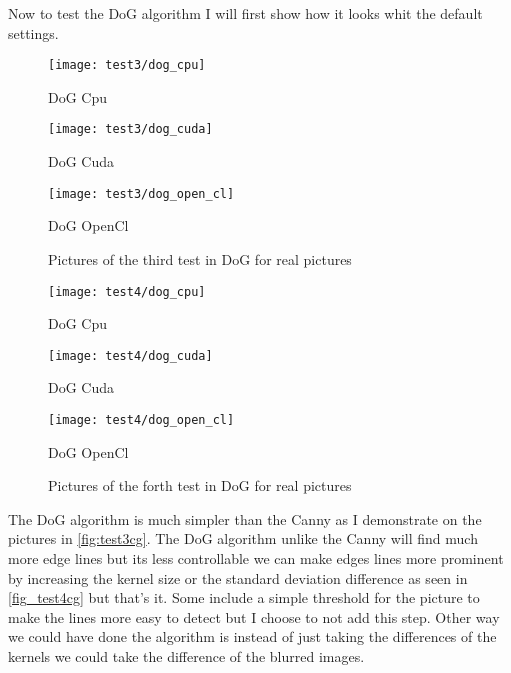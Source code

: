 Now to test the \ac{DoG} algorithm I will first show how it looks whit the default settings.
\begin{figure}[H]
\centering
\begin{minipage}[t]{.325\textwidth}
\centering
\texttt{[image: test3/dog\_cpu]}
\addtocounter{figure}{-1}
\captionsetup{labelformat=empty}
\caption[]{DoG Cpu}
\end{minipage}
\begin{minipage}[t]{.325\textwidth}
\centering
\texttt{[image: test3/dog\_cuda]}
\addtocounter{figure}{-1}
\captionsetup{labelformat=empty}
\caption[]{DoG Cuda}
\end{minipage}
\begin{minipage}[t]{.325\textwidth}
\centering
\texttt{[image: test3/dog\_open\_cl]}
\addtocounter{figure}{-1}
\captionsetup{labelformat=empty}
\caption[]{DoG OpenCl}
\end{minipage}
\caption{Pictures of the third test in \ac{DoG} for real pictures}
\label{fig:test3cg}
\end{figure}

\begin{figure}[H]
\centering
\begin{minipage}[t]{.325\textwidth}
\centering
\texttt{[image: test4/dog\_cpu]}
\addtocounter{figure}{-1}
\captionsetup{labelformat=empty}
\caption[]{DoG Cpu}
\end{minipage}
\begin{minipage}[t]{.325\textwidth}
\centering
\texttt{[image: test4/dog\_cuda]}
\addtocounter{figure}{-1}
\captionsetup{labelformat=empty}
\caption[]{DoG Cuda}
\end{minipage}
\begin{minipage}[t]{.325\textwidth}
\centering
\texttt{[image: test4/dog\_open\_cl]}
\addtocounter{figure}{-1}
\captionsetup{labelformat=empty}
\caption[]{DoG OpenCl}
\end{minipage}
\caption{Pictures of the forth test in \ac{DoG} for real pictures}
\label{fig:test4cg}
\end{figure}

The \ac{DoG} algorithm is much simpler than the \ac{Canny} as I demonstrate on the pictures in \autoref{fig:test3cg}. The \ac{DoG} algorithm unlike the \ac{Canny} will find much more edge lines but its less controllable we can make edges lines more prominent by increasing the kernel size or the standard deviation difference as seen in \autoref{fig_test4cg} but that's it. Some include a simple threshold for the picture to make the lines more easy to detect but I choose to not add this step. Other way we could have done the algorithm is instead of just taking the differences of the kernels we could take the difference of the blurred images.
\clearpage



